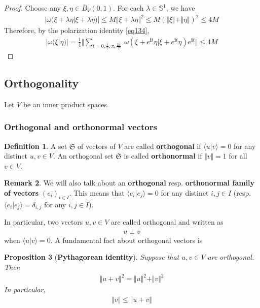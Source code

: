 \documentclass[12pt,b5paper,notitlepage]{article}
\theoremstyle{definition}
\newtheorem{df}{Definition}[subsection]
\newtheorem{rem}[df]{Remark}
\theoremstyle{plain}
\newtheorem{pp}[df]{Proposition}
\newcommand{\fk}{\mathfrak}
\newcommand{\ovl}{\overline}
\newcommand{\bk}[1]{\langle {#1}\rangle}
\newcommand{\im}{\mathbf{i}}
\newcommand{\Sbb}{{\mathbb S}}
\numberwithin{equation}{section}
\begin{document}
\begin{proof}
Choose any $\xi,\eta\in \ovl B_V(0,1)$. For each $\lambda\in\Sbb^1$, we have
\begin{align*}
|\omega(\xi+\lambda\eta|\xi+\lambda\eta)|\leq M\Vert \xi+\lambda\eta\Vert^2\leq M(\Vert\xi\Vert+\Vert\eta\Vert)^2\leq 4M
\end{align*}
Therefore, by the polarization identity \eqref{eq134},
\begin{align*}
|\omega(\xi|\eta)|=\frac 14\Big\Vert\sum_{t=0,\frac \pi 2,\pi,\frac{3\pi}2}~ \omega(\xi+e^{\im t}\eta|\xi+e^{\im t}
\eta)e^{\im t}\Big\Vert\leq 4M
\end{align*}
\end{proof}



\subsection{Orthogonality}



Let $V$ be an inner product spaces.



\subsubsection{Orthogonal and orthonormal vectors}

\begin{df}
A set $\fk S$ of vectors of $V$ are called \textbf{orthogonal}  if $\bk{u|v}=0$ for any distinct $u,v\in V$. An orthogonal set $\fk S$ is called \textbf{orthonormal}  if $\Vert v\Vert=1$ for all $v\in V$. 
\end{df}

\begin{rem}
We will also talk about an \textbf{orthogonal} resp.  \textbf{orthonormal family of vectors} $(e_i)_{i\in I}$. This means that $\bk{e_i|e_j}=0$ for any distinct $i,j\in I$ (resp. $\bk{e_i|e_j}=\delta_{i,j}$ for any $i,j\in I$). 
\end{rem}

In particular, two vectors $u,v\in V$ are called orthogonal and written as 
\begin{align*}
u\perp v
\end{align*}
when $\bk{u|v}=0$. A fundamental fact about orthogonal vectors is
\begin{pp}[\textbf{Pythagorean identity}]
Suppose that $u,v\in V$ are orthogonal. Then
\begin{align}\label{eq62}
\Vert u+v\Vert^2=\Vert u\Vert^2+\Vert v\Vert^2
\end{align}
In particular,
\begin{align}\label{eq63}
\Vert v\Vert\leq\Vert u+v\Vert
\end{align}
\end{pp}
\end{document}
